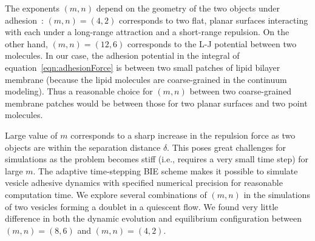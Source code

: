 \documentclass[prf,superscriptaddress,showpacs]{revtex4-1}
\begin{document}
The exponents $(m,n)$ depend on the geometry of the two objects under
adhesion~\cite{Book_IntermolecularSurfaceForces}: $(m,n)=(4,2)$
corresponds to two flat, planar surfaces interacting with each under a
long-range attraction and a short-range repulsion. On the other hand,
$(m,n) = (12,6)$ corresponds to the L-J potential between two molecules.
In our case, the adhesion potential in the integral of
equation~\eqref{eqn:adhesionForce} is between two small patches of lipid
bilayer membrane (because the lipid molecules are coarse-grained in the
continuum modeling).  Thus a reasonable choice for $(m,n)$ between two
coarse-grained membrane patches would be between those for two planar
surfaces and two point molecules. 
 
Large value of $m$ corresponds to a sharp increase in the repulsion
force as two objects are within the separation distance $\delta$.  This
poses great challenges for simulations as the problem becomes stiff
(i.e., requires a very small time step) for large $m$.  The adaptive
time-stepping BIE scheme makes it possible to simulate vesicle adhesive
dynamics with specified numerical precision for reasonable computation
time.  We explore several combinations of $(m,n)$ in the simulations of
two vesicles forming a doublet in a quiescent flow.  We found very
little difference in both the dynamic evolution and equilibrium
configuration between $(m,n)=(8,6)$ and $(m,n)=(4,2)$.

\end{document}
